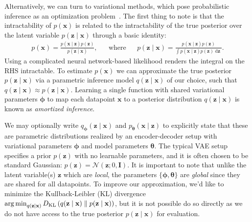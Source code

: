 Alternatively, we can turn to variational methods, which pose probabilistic inference as an optimization problem~\citep{jordan1999introduction}. The first thing to note is that the intractability of $p(\mathbf{x})$ is related to the intractability of the true posterior over the latent variable $p(\mathbf{z} \mid \mathbf{x})$ through a basic identity:
%
\begin{align}
    &&p(\mathbf{x}) = \frac{p(\mathbf{x} \mid \mathbf{z})p(\mathbf{z})}{p(\mathbf{z} \mid \mathbf{x})},
    &&
    \mathrm{where}
    &&p(\mathbf{z} 
    \mid \mathbf{x}) = \frac{p(\mathbf{x} \mid \mathbf{z})p(\mathbf{z})}{\int p(\mathbf{x} \mid \mathbf{z})p(\mathbf{z})\mathop{\mathrm{d}\mathbf{z}}}.&&
\end{align}
%
Using a complicated neural network-based likelihood renders the integral on the RHS intractable. To estimate $p(\mathbf{x})$ we can approximate the true posterior $p(\mathbf{z} \mid \mathbf{x})$ via a parametric inference model $q(\mathbf{z} \mid \mathbf{x})$ of our choice, such that $q(\mathbf{z} \mid \mathbf{x}) \approx p(\mathbf{z} \mid \mathbf{x})$. Learning a single function with shared variational parameters $\boldsymbol{\phi}$ to map each datapoint $\mathbf{x}$ to a posterior distribution $q(\mathbf{z} \mid \mathbf{x})$ is known as \textit{amortized inference}. 

We may optionally write $q_{\boldsymbol{\phi}}(\mathbf{z} \mid \mathbf{x})$ and $p_{\boldsymbol{\theta}}(\mathbf{x} \mid \mathbf{z})$ to explicitly state that these are parametric distributions realized by an encoder-decoder setup with variational parameters $\boldsymbol{\phi}$ and model parameters $\boldsymbol{\theta}$. The typical VAE setup specifies a prior $p(\mathbf{z})$ with no learnable parameters, and it is often chosen to be standard Gaussian: $p(\mathbf{z}) = \mathcal{N}(\mathbf{z}; 0, \mathbf{I})$. It is important to note that unlike the latent variable(s) $\mathbf{z}$ which are \textit{local}, the parameters $\{\boldsymbol{\phi}, \boldsymbol{\theta}\}$ are \textit{global} since they are shared for all datapoints. To improve our approximation, we'd like to minimize the Kullback-Leibler (KL) divergence $\operatorname*{arg\,min}_{q(\mathbf{z} \mid \mathbf{x})} D_{\mathrm{KL}} \left(q(\mathbf{z} \mid \mathbf{x}) \parallel p(\mathbf{z} \mid \mathbf{x}) \right)$, but it is not possible do so directly as we do not have access to the true posterior $p(\mathbf{z} \mid \mathbf{x})$ for evaluation.


